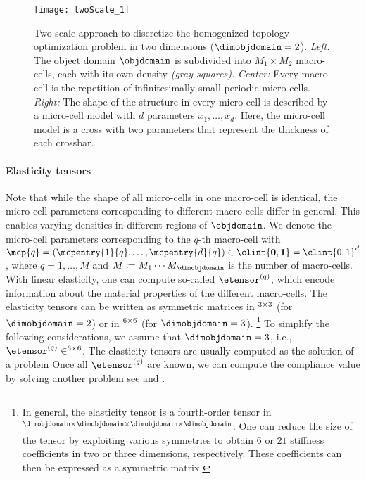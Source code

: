 \begin{figure}
  \texttt{[image: twoScale\_1]}%
  \caption[%
    Two-scale approach for topology optimization%
  ]{%
    Two-scale approach to discretize the homogenized topology
    optimization problem in two dimensions ($\dimobjdomain = 2$).
    \emph{Left:} The object domain $\objdomain$ is
    subdivided into $M_1 \times M_2$ macro-cells,
    each with its own density \emph{(gray squares).}
    \emph{Center:} Every macro-cell is the repetition of infinitesimally small
    periodic micro-cells.
    \emph{Right:} The shape of the structure in every micro-cell is
    described by a micro-cell model with $d$ parameters $x_1, \dotsc, x_d$.
    Here, the micro-cell model is a cross with two parameters
    that represent the thickness of each crossbar.%
  }%
  \label{fig:twoScale}%
\end{figure}

\paragraph{Elasticity tensors}

Note that while the shape of all micro-cells in one macro-cell is identical,
the micro-cell parameters corresponding to different macro-cells differ
in general.
This enables varying densities in different regions of $\objdomain$.
We denote the micro-cell parameters corresponding to the $q$-th macro-cell
with $\mcp{q} = (\mcpentry{1}{q}, \dotsc, \mcpentry{d}{q}) \in
\clint{\*0, \*1} = \clint{0, 1}^d$,
where $q = 1, \dotsc, M$ and
$M \ceq M_1 \dotsm M_{\dimobjdomain}$ is the number of macro-cells.
With linear elasticity,
one can compute so-called  $\etensor^{(q)}$,
which encode information about the material properties
of the different macro-cells.
The elasticity tensors can be written as symmetric matrices
in $\real^{3 \times 3}$ (for $\dimobjdomain = 2$) or
in $\real^{6 \times 6}$ (for $\dimobjdomain = 3$).%
\footnote{%
  In general, the elasticity tensor is a fourth-order tensor in
  $\real^{\dimobjdomain \times \dimobjdomain \times \dimobjdomain \times \dimobjdomain}$.
  One can reduce the size of the tensor by exploiting various symmetries
  \cite{Huebner14Mehrdimensionale}
  to obtain $6$ or $21$ stiffness coefficients
  in two or three dimensions, respectively.
  These coefficients can then be expressed as a symmetric matrix.%
}
To simplify the following considerations,
we assume that $\dimobjdomain = 3$, i.e.,
$\etensor^{(q)} \in \real^{6 \times 6}$.
The elasticity tensors are usually computed as the solution of a \fem problem
Once all $\etensor^{(q)}$ are known,
we can compute the compliance value
by solving another \fem problem 
see \cite{Allaire04Topology} and \cite{Huebner14Mehrdimensionale}.

